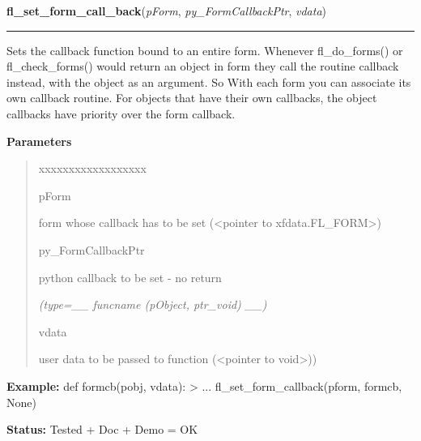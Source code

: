     \label{xformslib:library:fl_set_form_callback}

    \vspace{0.5ex}

\hspace{.8\funcindent}\begin{boxedminipage}{\funcwidth}

    \raggedright \textbf{fl\_set\_form\_call\_back}(\textit{pForm}, \textit{py\_FormCallbackPtr}, \textit{vdata})

    \vspace{-1.5ex}

    \rule{\textwidth}{0.5\fboxrule}
\setlength{\parskip}{2ex}
    Sets the callback function bound to an entire form. Whenever 
    fl\_do\_forms() or fl\_check\_forms() would return an object in form 
    they call the routine callback instead, with the object as an argument.
    So With each form you can associate its own callback routine. For 
    objects that have their own callbacks, the object callbacks have 
    priority over the form callback.

\setlength{\parskip}{1ex}
      \textbf{Parameters}
      \vspace{-1ex}

      \begin{quote}
        \begin{Ventry}{xxxxxxxxxxxxxxxxxx}

          \item[pForm]

          form whose callback has to be set ({\textless}pointer to 
          xfdata.FL\_FORM{\textgreater})

          \item[py\_FormCallbackPtr]

          python callback to be set - no return

            {\it (type=\_\_ funcname (pObject, ptr\_void) \_\_)}

          \item[vdata]

          user data to be passed to function ({\textless}pointer to 
          void{\textgreater}))

        \end{Ventry}

      \end{quote}

\textbf{Example:} def formcb(pobj, vdata): {\textgreater} ... fl\_set\_form\_callback(pform, 
formcb, None)



\textbf{Status:} Tested + Doc + Demo = OK



    \end{boxedminipage}

